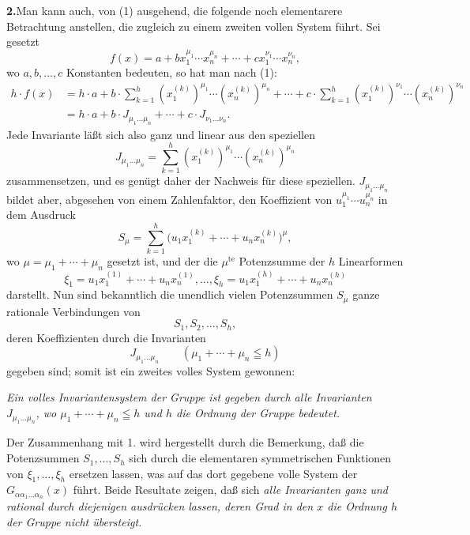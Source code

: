 \noindent\textbf{2.}\enspace Man kann auch, von (1) ausgehend, die folgende noch elementarere Betrachtung anstellen, die zugleich zu einem zweiten vollen System führt. Sei gesetzt
\[
  f(x)=a+b x_1^{\mu_1}\cdots x_n^{\mu_n}
       +\cdots+c x_1^{\nu_1}\cdots x_n^{\nu_n},
\]
wo $a,b,\ldots,c$ Konstanten bedeuten, so hat man nach (1):
\[
\begin{aligned}
 h\cdot f(x)
 &=h\cdot a+b\cdot\sum_{k=1}^{h}(x_1^{(k)})^{\mu_1}\cdots(x_n^{(k)})^{\mu_n}
     +\cdots
     +c\cdot\sum_{k=1}^{h}(x_1^{(k)})^{\nu_1}\cdots(x_n^{(k)})^{\nu_n} \\
 &=h\cdot a+b\cdot J_{\mu_1\ldots\mu_n}+\cdots+c\cdot J_{\nu_1\ldots\nu_n}.
\end{aligned}
\]
Jede Invariante läßt sich also ganz und linear aus den speziellen
\[
  J_{\mu_1\ldots\mu_n}
  =\sum_{k=1}^{h}(x_1^{(k)})^{\mu_1}\cdots(x_n^{(k)})^{\mu_n}
\]
zusammensetzen, und es genügt daher der Nachweis für diese speziellen. $J_{\mu_1\ldots\mu_n}$ bildet aber, abgesehen von einem Zahlenfaktor, den Koeffizient von $u_1^{\mu_1}\cdots u_n^{\mu_n}$ in dem Ausdruck
\[
  S_\mu=\sum_{k=1}^{h}
  \bigl(u_1x_1^{(k)}+\cdots+u_nx_n^{(k)}\bigr)^{\mu},
\]
wo $\mu=\mu_1+\cdots+\mu_n$ gesetzt ist, und der die $\mu^{\mathrm{te}}$ Potenzsumme der $h$ Linearformen
\[
  \xi_1=u_1x_1^{(1)}+\cdots+u_nx_n^{(1)},\ldots,
  \xi_h=u_1x_1^{(h)}+\cdots+u_nx_n^{(h)}
\]
darstellt. Nun sind bekanntlich die unendlich vielen Potenzsummen $S_\mu$ ganze rationale Verbindungen von
\[
  S_1,S_2,\ldots,S_h,
\]
deren Koeffizienten durch die Invarianten
\[
  J_{\mu_1\ldots\mu_n}\qquad(\mu_1+\cdots+\mu_n\leqq h)
\]
gegeben sind; somit ist ein zweites volles System gewonnen:

\emph{Ein volles Invariantensystem der Gruppe ist gegeben durch alle Invarianten $J_{\mu_1\ldots\mu_n}$, wo $\mu_1+\cdots+\mu_n\leqq h$ und $h$ die Ordnung der Gruppe bedeutet.}

Der Zusammenhang mit 1. wird hergestellt durch die Bemerkung, daß die Potenzsummen $S_1,\ldots,S_h$ sich durch die elementaren symmetrischen Funktionen von $\xi_1,\ldots,\xi_h$ ersetzen lassen, was auf das dort gegebene volle System der $G_{\alpha\alpha_1\ldots\alpha_n}(x)$ führt. Beide Resultate zeigen, daß sich \emph{alle Invarianten ganz und rational durch diejenigen ausdrücken lassen, deren Grad in den $x$ die Ordnung $h$ der Gruppe nicht übersteigt.}

